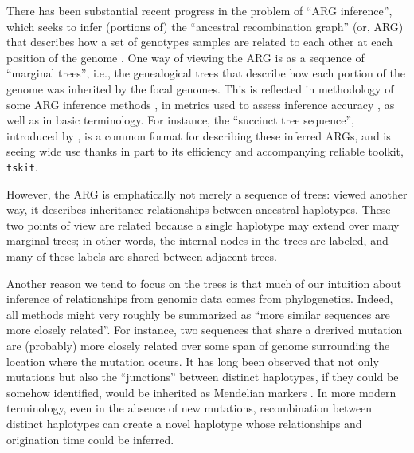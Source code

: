 \documentclass[10pt,twoside,lineno]{gsajnl}
\newcommand{\tskit}{\texttt{tskit}}
\begin{document}
There has been substantial recent progress
in the problem of ``ARG inference'',
which seeks to infer (portions of) the ``ancestral recombination graph'' (or, ARG)
that describes how a set of genotypes samples are related to each other
at each position of the genome \citep{speidel2019method,kelleher2019inferring,zhang2023biobankscale,deng2024robust,lewanski2024introduction}.
One way of viewing the ARG is as a sequence of ``marginal trees'',
i.e., the genealogical trees that describe how each portion of the genome
was inherited by the focal genomes.
This is reflected in methodology of some ARG inference methods \citep[e.g., Relate][]{speidel2019method},
in metrics used to assess inference accuracy \citep{XXX},
as well as in basic terminology.
For instance, 
the ``succinct tree sequence'',
introduced by \citet{kelleher2016efficient},
is a common format for describing these inferred ARGs,
and is seeing wide use thanks in part to its efficiency and accompanying reliable toolkit,
\tskit \citep{XXX}.

However, the ARG is emphatically not merely a sequence of trees:
viewed another way, it describes inheritance relationships between ancestral haplotypes.
These two points of view are related because a single haplotype
may extend over many marginal trees;
in other words, the internal nodes in the trees are labeled, and many of these labels
are shared between adjacent trees.

Another reason we tend to focus on the trees is that
much of our intuition about inference of relationships from genomic data
comes from phylogenetics.
Indeed, all methods might very roughly be summarized as
``more similar sequences are more closely related''.
For instance, two sequences that share a drerived mutation
are (probably) more closely related over some span of genome surrounding the location where the mutation occurs.
It has long been observed 
that not only mutations
but also the ``junctions'' between distinct haplotypes,
if they could be somehow identified,
would be inherited as Mendelian markers
\citet{fisher1954fuller,chapman2003model}.
In more modern terminology, 
even in the absence of new mutations,
recombination between distinct haplotypes can create a novel haplotype
whose relationships and origination time could be inferred.
\end{document}
